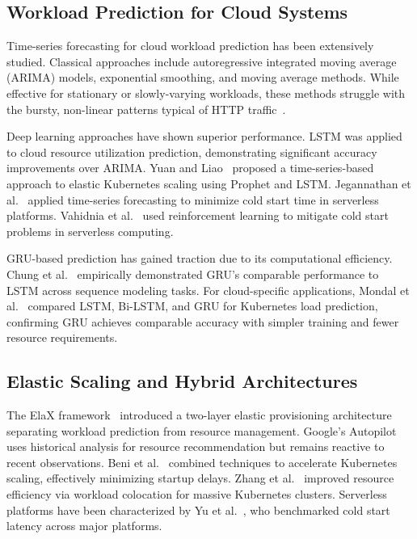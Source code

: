 \documentclass[conference,letterpaper]{IEEEtran}
\begin{document}
\subsection{Workload Prediction for Cloud Systems}

Time-series forecasting for cloud workload prediction has been extensively studied. Classical approaches include autoregressive integrated moving average (ARIMA) models, exponential smoothing, and moving average methods. While effective for stationary or slowly-varying workloads, these methods struggle with the bursty, non-linear patterns typical of HTTP traffic~\cite{he2020scaling}.

Deep learning approaches have shown superior performance. LSTM was applied to cloud resource utilization prediction, demonstrating significant accuracy improvements over ARIMA. Yuan and Liao~\cite{yuan2024elastic} proposed a time-series-based approach to elastic Kubernetes scaling using Prophet and LSTM. Jegannathan et al.~\cite{jegannathan2022timeseries} applied time-series forecasting to minimize cold start time in serverless platforms. Vahidnia et al.~\cite{vahidnia2023coldstart} used reinforcement learning to mitigate cold start problems in serverless computing.

GRU-based prediction has gained traction due to its computational efficiency. Chung et al.~\cite{chung2014empirical} empirically demonstrated GRU's comparable performance to LSTM across sequence modeling tasks. For cloud-specific applications, Mondal et al.~\cite{mondal2023kubernetes} compared LSTM, Bi-LSTM, and GRU for Kubernetes load prediction, confirming GRU achieves comparable accuracy with simpler training and fewer resource requirements.

\subsection{Elastic Scaling and Hybrid Architectures}

The ElaX framework~\cite{yang2019elax} introduced a two-layer elastic provisioning architecture separating workload prediction from resource management. Google's Autopilot~\cite{rzadca2020autopilot} uses historical analysis for resource recommendation but remains reactive to recent observations. Beni et al.~\cite{beni2021coldstart} combined techniques to accelerate Kubernetes scaling, effectively minimizing startup delays. Zhang et al.~\cite{zhang2021zeus} improved resource efficiency via workload colocation for massive Kubernetes clusters. Serverless platforms have been characterized by Yu et al.~\cite{yu2020serverlessbench}, who benchmarked cold start latency across major platforms.
\end{document}
